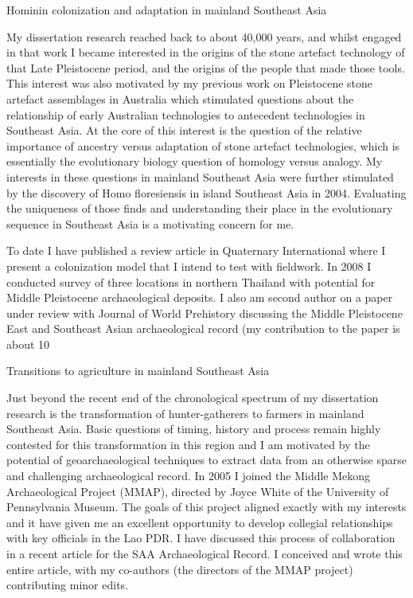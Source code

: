 \documentclass[11pt,article,oneside]{memoir}
\begin{document}
Hominin colonization and adaptation in mainland Southeast Asia

My dissertation research reached back to about 40,000 years, and whilst engaged in that work I became interested in the origins of the stone artefact technology of that Late Pleistocene period, and the origins of the people that made those tools. This interest was also motivated by my previous work on Pleistocene stone artefact assemblages in Australia which stimulated questions about the relationship of early Australian technologies to antecedent technologies in Southeast Asia. At the core of this interest is the question of the relative importance of ancestry versus adaptation of stone artefact technologies, which is essentially the evolutionary biology question of homology versus analogy. My interests in these questions in mainland Southeast Asia were further stimulated by the discovery of Homo floresiensis in island Southeast Asia in 2004. Evaluating the uniqueness of those finds and understanding their place in the evolutionary sequence in Southeast Asia is a motivating concern for me.

To date I have published a review article in Quaternary International where I present a colonization model that I intend to test with fieldwork. In 2008 I conducted survey of three locations in northern Thailand with potential for Middle Pleistocene archaeological deposits. I also am second author on a paper under review with Journal of World Prehistory discussing the Middle Pleistocene East and Southeast Asian archaeological record (my contribution to the paper is about 10%

Transitions to agriculture in mainland Southeast Asia

Just beyond the recent end of the chronological spectrum of my dissertation research is the transformation of hunter-gatherers to farmers in mainland Southeast Asia. Basic questions of timing, history and process remain highly contested for this transformation in this region and I am motivated by the potential of geoarchaeological techniques to extract data from an otherwise sparse and challenging archaeological record. In 2005 I joined the Middle Mekong Archaeological Project (MMAP), directed by Joyce White of the University of Pennsylvania Museum. The goals of this project aligned exactly with my interests and it have given me an excellent opportunity to develop collegial relationships with key officials in the Lao PDR. I have discussed this process of collaboration in a recent article for the SAA Archaeological Record. I conceived and wrote this entire article, with my co-authors (the directors of the MMAP project) contributing minor edits. 
\end{document}
